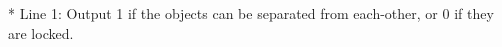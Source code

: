 * Line 1: Output 1 if the objects can be separated from each-other, or         0 if they are locked.